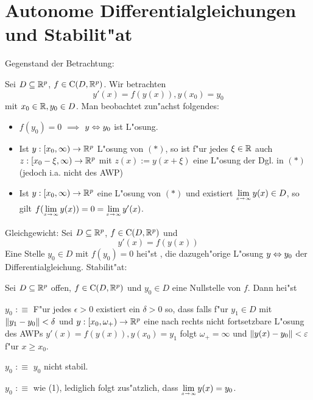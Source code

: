 \section{Autonome Differentialgleichungen und Stabilit"at}
\remark Gegenstand der Betrachtung:{
  Sei $D\subseteq\mathbb R^p$, $f\in{\rm C}(D,\mathbb R^p)$. Wir betrachten
  \begin{equation*}
    \tag{*} y'(x)=f(y(x)),y(x_0)=y_0
    \end{equation*}
  mit $x_0\in\mathbb R,y_0\in D$. Man beobachtet zun"achst folgendes:
  \begin{itemize}
    \item $f(y_0)=0$ $\implies$ $y\ident y_0$ ist L"osung.
    \item Ist $y:[x_0,\infty)\to\mathbb R^p$ L"osung von $(*)$, so ist f"ur
      jedes $\xi\in\mathbb R$ auch $z:[x_0-\xi,\infty)\to\mathbb R^p$ mit $z(x):=y(x+\xi)$
      eine L"osung der Dgl. in $(*)$ (jedoch i.a. nicht des AWP)
    \item Ist $y:[x_0,\infty)\to\mathbb R^p$ eine L"osung von $(*)$ und 
      existiert $\limes x->\infty y(x)\in D$, so gilt 
      $f(\limes x->\infty y(x))=0=\limes x->\infty y'(x)$.
    \end{itemize}
  }
 Gleichgewicht:{
  Sei $D\subseteq\mathbb R^p$, $f\in{\rm C}(D,\mathbb R^p)$ und
  \begin{equation*}
    \tag{*} y'(x)=f(y(x))
    \end{equation*}
  Eine Stelle $y_0\in D$ mit $f(y_0)=0$ hei"st
  , die dazugeh"orige L"osung
  $y\ident y_0$  der Differentialgleichung.
  }
 Stabilit"at:{
  Sei $D\subseteq\mathbb R^p$ offen, $f\in{\rm C}(D,\mathbb R^p)$ und $y_0\in D$
  eine Nullstelle von $f$. Dann hei"st
  \begin{stmts}
    \item $y_0$ 
      $:\equiv$ F"ur jedes $\epsilon>0$ existiert
      ein $\delta>0$ so, dass falls f"ur $y_1\in D$ mit ${\left\| y_1-y_0\right\|}<\delta$
      und $y:[x_0,\omega_+)\to\mathbb R^p$ eine nach rechts nicht fortsetzbare
      L"osung des AWPs $y'(x)=f(y(x)),y(x_0)=y_1$ folgt $\omega_+=\infty$
      und ${\left\| y(x)-y_0\right\|}<\varepsilon$ f"ur $x\geq x_0$.
    \item $y_0$ 
      $:\equiv$ $y_0$ nicht stabil.
    \item $y_0$ 
      $:\equiv$ wie (1), lediglich folgt 
      zus"atzlich, dass $\limes x->\infty y(x)=y_0$.
    \end{stmts}
  }
